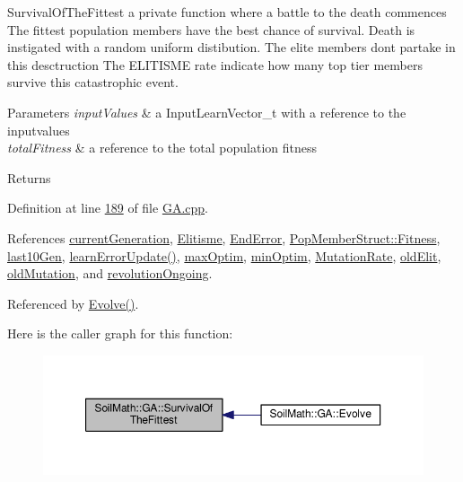 Survival\+Of\+The\+Fittest a private function where a battle to the death commences The fittest population members have the best chance of survival. Death is instigated with a random uniform distibution. The elite members don\textquotesingle{}t partake in this desctruction The E\+L\+I\+T\+I\+S\+M\+E rate indicate how many top tier members survive this catastrophic event. 


\begin{DoxyParams}{Parameters}
{\em input\+Values} & a Input\+Learn\+Vector\+\_\+t with a reference to the inputvalues \\
\hline
{\em total\+Fitness} & a reference to the total population fitness \\
\hline
\end{DoxyParams}
\begin{DoxyReturn}{Returns}

\end{DoxyReturn}


Definition at line \hyperlink{_g_a_8cpp_source_l00189}{189} of file \hyperlink{_g_a_8cpp_source}{G\+A.\+cpp}.



References \hyperlink{_g_a_8h_source_l00105}{current\+Generation}, \hyperlink{_g_a_8h_source_l00041}{Elitisme}, \hyperlink{_g_a_8h_source_l00042}{End\+Error}, \hyperlink{_soil_math_types_8h_source_l00037}{Pop\+Member\+Struct\+::\+Fitness}, \hyperlink{_g_a_8h_source_l00104}{last10\+Gen}, \hyperlink{class_soil_math_1_1_g_a_a3b7d8649411ccebc8cb6f44ed1ba2365}{learn\+Error\+Update()}, \hyperlink{_g_a_8h_source_l00101}{max\+Optim}, \hyperlink{_g_a_8h_source_l00100}{min\+Optim}, \hyperlink{_g_a_8h_source_l00040}{Mutation\+Rate}, \hyperlink{_g_a_8h_source_l00102}{old\+Elit}, \hyperlink{_g_a_8h_source_l00103}{old\+Mutation}, and \hyperlink{_g_a_8h_source_l00106}{revolution\+Ongoing}.



Referenced by \hyperlink{_g_a_8cpp_source_l00023}{Evolve()}.



Here is the caller graph for this function\+:
\nopagebreak
\begin{figure}[H]
\begin{center}
\leavevmode
\includegraphics[width=350pt]{class_soil_math_1_1_g_a_ac2c10631815408d044738f678c67e98b_icgraph}
\end{center}
\end{figure}




